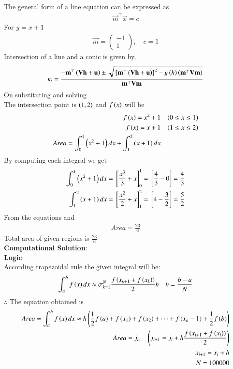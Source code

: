 \documentclass[journal]{IEEEtran}
\begin{document}
The general form of a line equation can be expressed as
\begin{align}
    \vec{m}^\top \vec{x} = c
\end{align}
For $y=x+1$
\begin{align}
    \vec{m} = \begin{pmatrix} -1 \\ 1 \end{pmatrix}, \quad c = 1
\end{align}
Intersection of a line and a conic is given by,
\begin{align}
  \kappa_i=\frac{-\mathbf{m}^{\top}\left(\mathbf{Vh}+\mathbf{u}\right)\pm\sqrt{{}\left[\mathbf{m}^{\top}\left(\mathbf{Vh}+\mathbf{u}\right)\right]^2-g\left(h\right)\left(\mathbf{m}^{\top}\mathbf{Vm}\right)}}{\mathbf{m}^{\top}\mathbf{Vm}}
\end{align}
On substituting and solving \\
The intersection point is $\left(1,2\right)$ and
$f\left(x\right)$ will be
\begin{align}
	f\left(x\right) = x^2 +1  && \left(0 \le x \le 1\right) \\
	f\left(x\right) = x+1 && \left(1 \le x \le 2\right) \\
	Area = \int_{0}^{1}\left(x^2+1\right) dx + \int_{1}^{2} \left(x+1\right) dx
\end{align}
By computing each integral we get
\begin{align}
	\int_{0}^{1}\left(x^2+1\right) dx = {}\left[\frac{x^3}{3} + x\right]_{0}^{1} = {}\left[\frac{4}{3} -0 \right] = \frac{4}{3} \\
	\int_{1}^{2}\left(x+1\right) dx = {}\left[\frac{x^2}{2} + x\right]_{1}^{2} = {}\left[4 - \frac{3}{2}\right] = \frac{5}{2}
\end{align}
From the equations  and  
\begin{align}
	Area = \frac{23}{6}
\end{align}
Total area of given regions is $\frac{23}{6}$ \\
\textbf{Computational Solution}: \\
\textbf{Logic}: \\
According trapezoidal rule the given integral will be:
\begin{align}
	\int_{a}^{b} f\left(x\right) dx \approx \sigma_{k = 1}^{N} \frac{f\left(x_{k+1} + f\left(x_k\right)\right)}{2} h && h = \frac{b-a}{N}
\end{align}
$\therefore$ The equation obtained is
\begin{align}
	Area = \int_{a}^{b} f\left(x\right) dx \approx h\left(\frac{1}{2}f\left(a\right)+f\left(x_1\right)+ f\left(x_2\right) + \dots + f\left(x_n-1\right)+\frac{1}{2}f\left(b\right)\right) \\
	Area = j_n \quad \left(j_{i+1} = j_i + h\frac{f\left(x_{i+1} + f\left(x_i\right)\right)}{2}\right) \\
	x_{i+1} = x_i + h \\
	N = 100000
\end{align}
\end{document}

